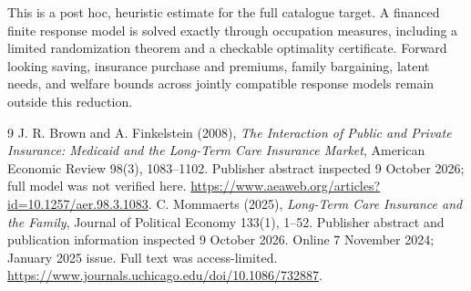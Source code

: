 \documentclass[11pt]{article}
\theoremstyle{remark}
\begin{document}
This is a post hoc, heuristic estimate for the full catalogue target.
A financed finite response model is solved exactly through occupation measures, including a limited randomization theorem and a checkable optimality certificate. Forward looking saving, insurance purchase and premiums, family bargaining, latent needs, and welfare bounds across jointly compatible response models remain outside this reduction.

\begin{thebibliography}{9}
 J. R. Brown and A. Finkelstein (2008), \emph{The Interaction of Public and Private Insurance: Medicaid and the Long-Term Care Insurance Market}, American Economic Review 98(3), 1083--1102. Publisher abstract inspected 9 October 2026; full model was not verified here. \url{https://www.aeaweb.org/articles?id=10.1257/aer.98.3.1083}.
 C. Mommaerts (2025), \emph{Long-Term Care Insurance and the Family}, Journal of Political Economy 133(1), 1--52. Publisher abstract and publication information inspected 9 October 2026. Online 7 November 2024; January 2025 issue. Full text was access-limited. \url{https://www.journals.uchicago.edu/doi/10.1086/732887}.
\end{thebibliography}
\end{document}
